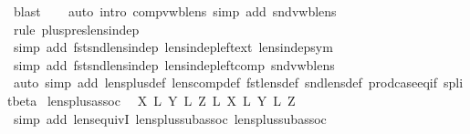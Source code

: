 \begin{isabellebody}
\ blast\isanewline
\ \ \isamarkupfalse%
\ {\isacharparenleft}auto\ intro{\isacharcolon}\ comp{\isacharunderscore}vwb{\isacharunderscore}lens\ simp\ add{\isacharcolon}\ snd{\isacharunderscore}vwb{\isacharunderscore}lens{\isacharparenright}\isanewline
\ \ \isamarkupfalse%
\ {\isacharparenleft}rule\ plus{\isacharunderscore}pres{\isacharunderscore}lens{\isacharunderscore}indep{\isacharparenright}\isanewline
\ \ \isamarkupfalse%
\ {\isacharparenleft}simp\ add{\isacharcolon}\ fst{\isacharunderscore}snd{\isacharunderscore}lens{\isacharunderscore}indep\ lens{\isacharunderscore}indep{\isacharunderscore}left{\isacharunderscore}ext\ lens{\isacharunderscore}indep{\isacharunderscore}sym{\isacharparenright}\isanewline
\ \ \isamarkupfalse%
\ {\isacharparenleft}simp\ add{\isacharcolon}\ fst{\isacharunderscore}snd{\isacharunderscore}lens{\isacharunderscore}indep\ lens{\isacharunderscore}indep{\isacharunderscore}left{\isacharunderscore}comp\ snd{\isacharunderscore}vwb{\isacharunderscore}lens{\isacharparenright}\isanewline
\ \ \isamarkupfalse%
\ {\isacharparenleft}auto\ simp\ add{\isacharcolon}\ lens{\isacharunderscore}plus{\isacharunderscore}def\ lens{\isacharunderscore}comp{\isacharunderscore}def\ fst{\isacharunderscore}lens{\isacharunderscore}def\ snd{\isacharunderscore}lens{\isacharunderscore}def\ prod{\isachardot}case{\isacharunderscore}eq{\isacharunderscore}if\ split{\isacharunderscore}beta{\isacharprime}{\isacharparenright}{\isacharbrackleft}{}{\isacharbrackright}\isanewline
{}\isamarkupfalse%
%
\endisatagproof
{\isafoldproof}%
%
\isadelimproof
\isanewline
%
\endisadelimproof
\isanewline
{}\isamarkupfalse%
\ lens{\isacharunderscore}plus{\isacharunderscore}assoc{\isacharcolon}\isanewline
\ \ {\isachardoublequoteopen}{\isacharparenleft}X\ {\isacharplus}\isactrlsub L\ Y{\isacharparenright}\ {\isacharplus}\isactrlsub L\ Z\ {\isasymapprox}\isactrlsub L\ X\ {\isacharplus}\isactrlsub L\ Y\ {\isacharplus}\isactrlsub L\ Z{\isachardoublequoteclose}\isanewline
%
\isadelimproof
\ \ %
\endisadelimproof
%
\isatagproof
{}\isamarkupfalse%
\ {\isacharparenleft}simp\ add{\isacharcolon}\ lens{\isacharunderscore}equivI\ lens{\isacharunderscore}plus{\isacharunderscore}sub{\isacharunderscore}assoc{\isacharunderscore}{}\ lens{\isacharunderscore}plus{\isacharunderscore}sub{\isacharunderscore}assoc{\isacharunderscore}{}{\isacharparenright}%
\endisatagproof
{\isafoldproof}%
%
\isadelimproof
\isanewline
%
\endisadelimproof
\isanewline

\end{isabellebody}
